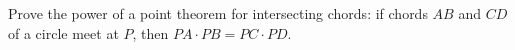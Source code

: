 Prove the power of a point theorem for intersecting chords: if chords $AB$ and $CD$ of a circle meet at $P$, then $PA\cdot PB=PC\cdot PD$.
